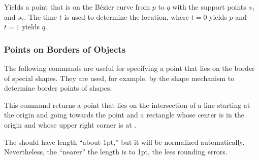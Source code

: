 \begin{command}{\pgfpointcurveattime{}}
  Yields a point that is on the B\'ezier curve from $p$ to $q$ with the
  support points $s_1$ and $s_2$. The time $t$ is used to determine
  the location, where $t=0$ yields $p$ and $t=1$ yields $q$.

\begin{codeexample}[]
\end{codeexample}
\end{command}

\subsubsection{Points on Borders of Objects}

The following commands are useful for specifying a point that lies on
the border of special shapes. They are used, for example, by the shape
mechanism to determine border points of shapes.

\begin{command}{\pgfpointborderrectangle{}}
  This command returns a point that lies on the intersection of a line
  starting at the origin and going towards the point  and a rectangle whose center is in the origin and whose
  upper right corner is at .

  The  should have length ``about 1pt,'' but it
  will be normalized automatically. Nevertheless, the ``nearer'' the
  length is to 1pt, the less rounding errors.

\begin{codeexample}[]
\end{codeexample}
\end{command}


